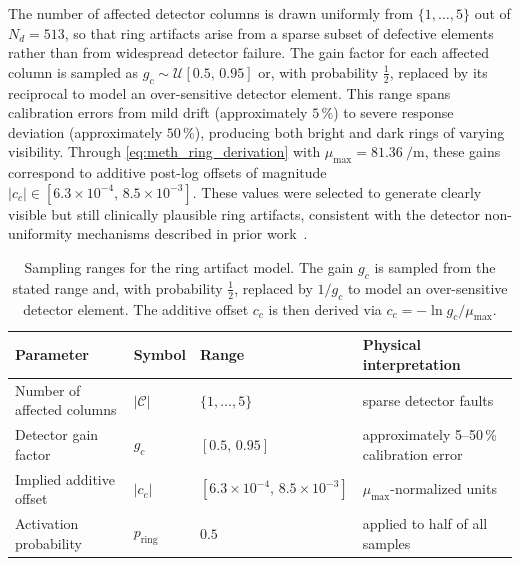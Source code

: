 The number of affected detector columns is drawn uniformly from $\{1,\dots,5\}$ out of $N_d=513$, so that ring artifacts arise from a sparse subset of defective elements rather than from widespread detector failure. The gain factor for each affected column is sampled as $g_c \sim \mathcal{U}[0.5,\,0.95]$ or, with probability $\tfrac12$, replaced by its reciprocal to model an over-sensitive detector element. This range spans calibration errors from mild drift (approximately $5\,\%$) to severe response deviation (approximately $50\,\%$), producing both bright and dark rings of varying visibility. Through \eqref{eq:meth_ring_derivation} with $\mu_{\max}=\SI{81.36}{\per\metre}$, these gains correspond to additive post-log offsets of magnitude $|c_c| \in [6.3\times10^{-4},\,8.5\times10^{-3}]$. These values were selected to generate clearly visible but still clinically plausible ring artifacts, consistent with the detector non-uniformity mechanisms described in prior work~\cite{Sijbers2004, Prell2009}.

\begin{table}[!htb]
    \centering
    \caption[Parameters of the ring artifact model.]{%
        Sampling ranges for the ring artifact model. The gain $g_c$ is sampled from the stated range and, with probability $\tfrac12$, replaced by $1/g_c$ to model an over-sensitive detector element. The additive offset $c_c$ is then derived via $c_c=-\ln g_c/\mu_{\max}$.}
    \label{tab:meth_ring_params}
    \begin{tabular}{llll}
        \toprule
        Parameter                    & Symbol                & Range                              & Physical interpretation \\
        \midrule
        Number of affected columns   & $|\mathcal{C}|$       & $\{1,\dots,5\}$                    & sparse detector faults \\
        Detector gain factor         & $g_c$                 & $[0.5,\,0.95]$                     & approximately 5--50\,\% calibration error \\
        Implied additive offset      & $|c_c|$               & $[6.3\times10^{-4},\,8.5\times10^{-3}]$ & $\mu_{\max}$-normalized units \\
        Activation probability       & $p_\text{ring}$       & $0.5$                              & applied to half of all samples \\
        \bottomrule
    \end{tabular}
\end{table}

